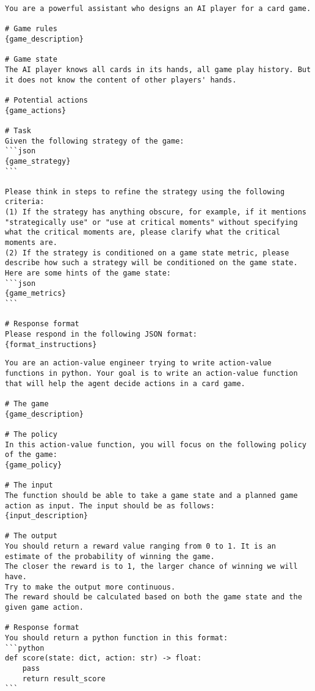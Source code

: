 \begin{tcolorbox}[
breakable,
title=Mutually inspire game policy components in text,  
colframe=promptcolor, 
colback=white,
]
\begin{lstlisting}[]
You are a powerful assistant who designs an AI player for a card game.

# Game rules
{game_description}

# Game state
The AI player knows all cards in its hands, all game play history. But it does not know the content of other players' hands.

# Potential actions
{game_actions}

# Task
Given the following strategy of the game:
```json
{game_strategy}
```

Please think in steps to refine the strategy using the following criteria:
(1) If the strategy has anything obscure, for example, if it mentions "strategically use" or "use at critical moments" without specifying what the critical moments are, please clarify what the critical moments are.
(2) If the strategy is conditioned on a game state metric, please describe how such a strategy will be conditioned on the game state. Here are some hints of the game state:
```json
{game_metrics}
```

# Response format
Please respond in the following JSON format:
{format_instructions}
\end{lstlisting}
\end{tcolorbox}



\begin{tcolorbox}[
breakable,
title=Design code for game policy components,  
colframe=promptcolor, 
colback=white,
]
\begin{lstlisting}[]
You are an action-value engineer trying to write action-value functions in python. Your goal is to write an action-value function that will help the agent decide actions in a card game.

# The game
{game_description}

# The policy
In this action-value function, you will focus on the following policy of the game:
{game_policy}

# The input
The function should be able to take a game state and a planned game action as input. The input should be as follows:
{input_description}

# The output
You should return a reward value ranging from 0 to 1. It is an estimate of the probability of winning the game. 
The closer the reward is to 1, the larger chance of winning we will have.
Try to make the output more continuous.
The reward should be calculated based on both the game state and the given game action.

# Response format
You should return a python function in this format:
```python
def score(state: dict, action: str) -> float:
    pass
    return result_score
```
\end{lstlisting}
\end{tcolorbox}


